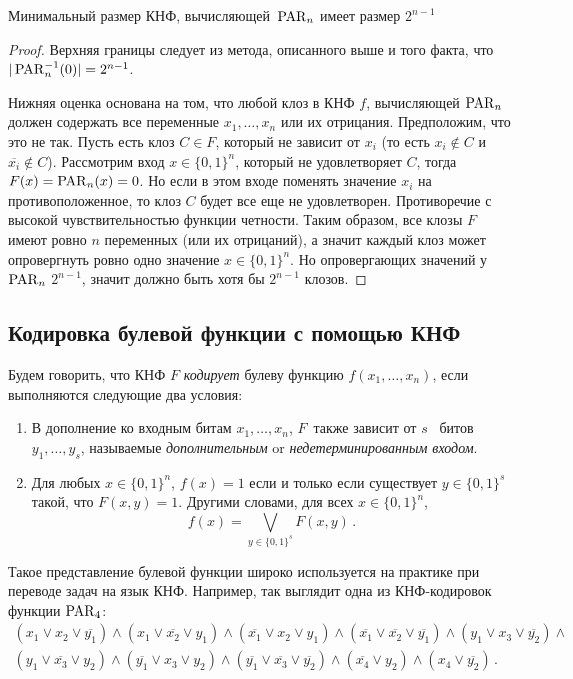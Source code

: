 \begin{lemma}\label{lemma:detparity}
	Минимальный размер КНФ, вычисляющей~$\operatorname{PAR}_n$ имеет размер $2^{n-1}$
\end{lemma}
\begin{proof}
	Верхняя границы следует из метода, описанного выше и того факта, что $|\operatorname{PAR}_n^{-1}(0)|=2^{n-1}$.
	
	Нижняя оценка основана на том, что любой клоз в КНФ $f$, вычисляющей $\operatorname{PAR}_n$ должен содержать все переменные $x_1, \dotsc, x_n$ или их отрицания. 
	Предположим, что это не так.
	Пусть есть клоз $C \in F$, который не зависит от $x_i$ (то есть $x_i \not \in C$ и $\overline{x_i} \not \in C$).
	Рассмотрим вход $x \in \{0, 1\}^n$, который не удовлетворяет $C$, 
	тогда $F(x)=\operatorname{PAR}_n(x)=0$. 
	Но если в этом входе поменять значение $x_i$ на противоположенное, 
	то клоз $C$ будет все еще не удовлетворен. 
	Противоречие с высокой чувствительностью функции четности. 
	Таким образом, все клозы $F$ имеют ровно $n$ переменных (или их отрицаний), 
	а значит каждый клоз может опровергнуть ровно одно значение
	 $x \in \{0, 1\}^n$. 
	Но опровергающих значений у $\operatorname{PAR}_n$ $2^{n-1}$, значит должно быть хотя бы $2^{n - 1}$ клозов.
	
\end{proof}

\subsection{Кодировка булевой функции с помощью КНФ}
Будем говорить, что КНФ $F$ \emph{кодирует} булеву функцию $f(x_1, \dotsc, x_n)$, если выполняются следующие два условия:
\begin{enumerate}
	\item В дополнение ко входным битам $x_1, \dotsc, x_n$, $F$~также зависит от  $s$~ битов $y_1, \dotsc, y_s$, называемые \emph{дополнительным} or \emph{недетерминированным входом}.
	\item Для любых $x \in \{0,1\}^n$, $f(x)=1$ если и только если существует $y \in \{0,1\}^s$ такой, что $F(x,y)=1$. Другими словами, для всех $x \in \{0,1\}^n$,
	\begin{equation}\label{eq:enc}
		f(x) = \bigvee_{y \in \{0,1\}^s}F(x,y) \, .
	\end{equation}
\end{enumerate}
Такое представление булевой функции широко используется на практике при переводе задач на язык КНФ. Например, так выглядит одна из КНФ-кодировок функции $\operatorname{PAR}_4$: 
\begin{multline}\label{eq:toyenc}
	(x_1 \lor x_2 \lor \overline{y_1}) \land (x_1 \lor  \overline{x_2} \lor y_1) \land (\overline{x_1} \lor x_2 \lor y_1) \land (\overline{x_1} \lor \overline{x_2} \lor \overline{y_1})
	\land
	(y_1 \lor x_3 \lor \overline{y_2}) \land\\ (y_1 \lor  \overline{x_3} \lor y_2) \land (\overline{y_1} \lor x_3 \lor y_2) \land (\overline{y_1} \lor \overline{x_3} \lor \overline{y_2})
	\land (\overline{x_4} \lor y_2) \land (x_4 \lor \overline{y_2}) \, .
\end{multline}

